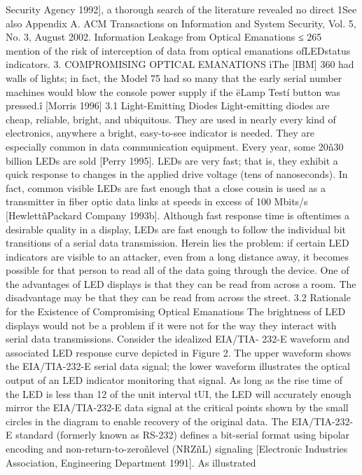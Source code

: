 Security Agency 1992], a thorough search of the literature revealed no direct 
1See also Appendix A. 
ACM Transactions on Information and System Security, Vol. 5, No. 3, August 2002.
Information Leakage from Optical Emanations ≤ 265 
mention of the risk of interception of data from optical emanations ofLEDstatus 
indicators. 
3. COMPROMISING OPTICAL EMANATIONS 
ìThe [IBM] 360 had walls of lights; in fact, the Model 75 had so many 
that the early serial number machines would blow the console power 
supply if the ëLamp Testí button was pressed.î [Morris 1996] 
3.1 Light-Emitting Diodes 
Light-emitting diodes are cheap, reliable, bright, and ubiquitous. They are used 
in nearly every kind of electronics, anywhere a bright, easy-to-see indicator is 
needed. They are especially common in data communication equipment. Every 
year, some 20ñ30 billion LEDs are sold [Perry 1995]. 
LEDs are very fast; that is, they exhibit a quick response to changes in the 
applied drive voltage (tens of nanoseconds). In fact, common visible LEDs are 
fast enough that a close cousin is used as a transmitter in fiber optic data links 
at speeds in excess of 100 Mbits/s [HewlettñPackard Company 1993b]. 
Although fast response time is oftentimes a desirable quality in a display, 
LEDs are fast enough to follow the individual bit transitions of a serial data 
transmission. Herein lies the problem: if certain LED indicators are visible to 
an attacker, even from a long distance away, it becomes possible for that person 
to read all of the data going through the device. 
One of the advantages of LED displays is that they can be read from across 
a room. The disadvantage may be that they can be read from across the street. 
3.2 Rationale for the Existence of Compromising Optical Emanations 
The brightness of LED displays would not be a problem if it were not for the way 
they interact with serial data transmissions. Consider the idealized EIA/TIA- 
232-E waveform and associated LED response curve depicted in Figure 2. The 
upper waveform shows the EIA/TIA-232-E serial data signal; the lower waveform 
illustrates the optical output of an LED indicator monitoring that signal. 
As long as the rise time of the LED is less than 12 
of the unit interval tUI, the 
LED will accurately enough mirror the EIA/TIA-232-E data signal at the critical 
points shown by the small circles in the diagram to enable recovery of the 
original data. 
The EIA/TIA-232-E standard (formerly known as RS-232) defines a bit-serial 
format using bipolar encoding and non-return-to-zeroñlevel (NRZñL) signaling 
[Electronic Industries Association, Engineering Department 1991]. As illustrated 
